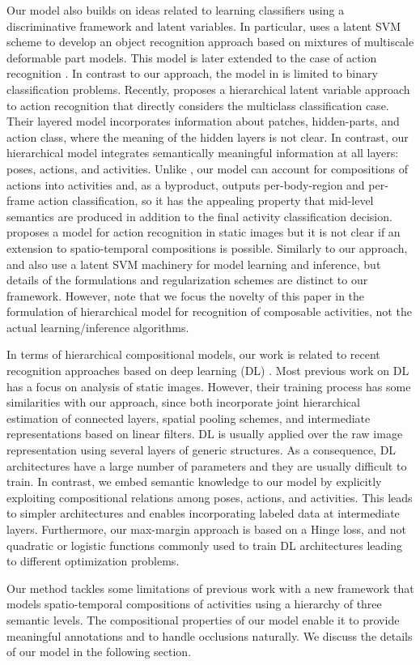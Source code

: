 Our model also builds on ideas related to learning classifiers using a
discriminative framework and latent variables. In
particular, \cite{Felzenszwalb:Mcallester:Ramanan:2008} uses a latent SVM
scheme to develop an object recognition approach based on mixtures of multiscale
deformable part models. This model is later extended to the case of action
recognition \cite{Niebles2010a}. In contrast to our approach, the model in
\cite{Niebles2010a} is limited to binary classification
problems. Recently,
\cite{Wang:Mori:11} proposes a hierarchical latent variable approach to action
recognition that directly considers the
multiclass classification case. Their layered model
incorporates information about patches, hidden-parts, and action class, where
the meaning of the hidden layers is not clear. In contrast, our hierarchical
model integrates semantically meaningful information at all layers: poses,
actions, and activities. Unlike \cite{Wang:Mori:11}, our model can account for
compositions of actions into activities and, as a byproduct, outputs
per-body-region and per-frame action classification, so it has the appealing
property that mid-level semantics are produced in addition to the final activity
classification decision. \cite{Wang2012} proposes a model for action recognition
in static images but it is not clear if an
extension to spatio-temporal compositions is possible. Similarly to our
approach, \cite{Wang:Mori:11} and \cite{Wang2012} also use a latent SVM
machinery for model learning and inference, but details of the formulations
and regularization schemes are distinct to our framework.
However, note that we focus the novelty of this paper in the formulation of
hierarchical model for recognition of composable activities,
not the actual learning/inference algorithms.

In terms of hierarchical compositional models, our work is related to recent
recognition approaches based on deep learning (DL)
\cite{Bengio:09,KrizhevskyEtAl:12}.
Most previous work on DL has a focus
on analysis of static images.
However, their training process has some
similarities with our approach, since both incorporate joint hierarchical
estimation of connected layers, spatial pooling
schemes, and intermediate representations based on linear filters.
DL is usually applied over the raw image representation using several layers of
generic structures. As a consequence, DL architectures have a large number of
parameters and they are usually difficult to train. In contrast, we embed
semantic knowledge to our
model by explicitly exploiting compositional relations among
poses, actions, and activities. This leads to simpler architectures and
enables incorporating labeled data at intermediate layers. Furthermore, our
max-margin approach is based on a Hinge loss,
and not quadratic or logistic functions commonly used to train DL architectures
leading to different optimization problems.

Our method tackles some limitations of previous work with
a new framework that models spatio-temporal compositions of activities using a
hierarchy of three semantic levels. The compositional properties of our model
enable it to provide meaningful annotations and to handle occlusions naturally.
We discuss the details of our model in the following section.
